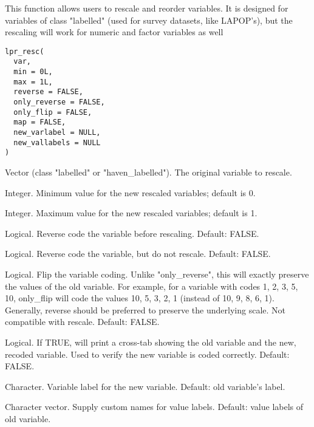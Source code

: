 \documentclass[a4paper]{book}
\begin{document}
%
\begin{Description}
This function allows users to rescale and reorder variables.  It is designed
for variables of class "labelled" (used for survey datasets, like LAPOP's),
but the rescaling will work for numeric and factor variables as well
\end{Description}
%
\begin{Usage}
\begin{verbatim}
lpr_resc(
  var,
  min = 0L,
  max = 1L,
  reverse = FALSE,
  only_reverse = FALSE,
  only_flip = FALSE,
  map = FALSE,
  new_varlabel = NULL,
  new_vallabels = NULL
)
\end{verbatim}
\end{Usage}
%
\begin{Arguments}
\begin{ldescription}
\item[\code{var}] Vector (class "labelled" or "haven\_labelled").  The original variable
to rescale.

\item[\code{min}] Integer. Minimum value for the new rescaled variables; default is 0.

\item[\code{max}] Integer. Maximum value for the new rescaled variables; default is 1.

\item[\code{reverse}] Logical.  Reverse code the variable before rescaling. Default: FALSE.

\item[\code{only\_reverse}] Logical.  Reverse code the variable, but do not rescale. Default: FALSE.

\item[\code{only\_flip}] Logical. Flip the variable coding.  Unlike "only\_reverse", this will
exactly preserve the values of the old variable.  For example, for a variable
with codes 1, 2, 3, 5, 10, only\_flip will code the values 10, 5, 3, 2, 1 (instead
of 10, 9, 8, 6, 1).  Generally, reverse should be preferred to preserve the
underlying scale.  Not compatible with rescale. Default: FALSE.

\item[\code{map}] Logical. If TRUE, will print a cross-tab showing the old variable
and the new, recoded variable.  Used to verify the new variable is coded correctly.
Default: FALSE.

\item[\code{new\_varlabel}] Character.  Variable label for the new variable.
Default: old variable's label.

\item[\code{new\_vallabels}] Character vector. Supply custom names for value labels. Default:
value labels of old variable.
\end{ldescription}
\end{Arguments}
\end{document}
